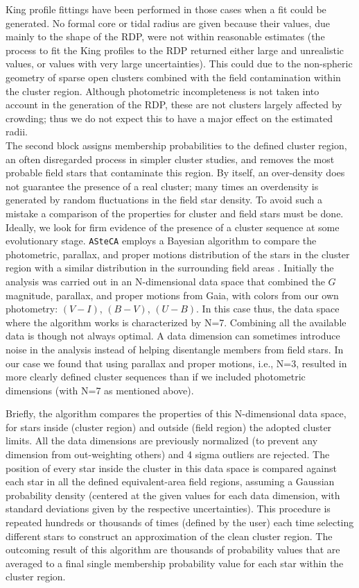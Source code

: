 \documentclass[draft]{aa}
\begin{document}
King profile \citep{King_1962} fittings have been performed in those cases when
a fit could be generated. No formal core or tidal radius are given because
their values, due mainly to the shape of the RDP, were not within reasonable
estimates (the process to fit the King profiles to the RDP returned either
large and unrealistic values, or values with very large uncertainties).
This could due to the non-spheric geometry of sparse open clusters
combined with the field contamination within the cluster region. Although
photometric incompleteness is not taken into account in the generation of the
RDP, these are not clusters largely affected by crowding; thus we do not
expect this to have a major effect on the estimated radii.\\

The second block assigns membership probabilities to the defined
cluster region, an often disregarded process in simpler cluster studies, 
and removes the most probable field stars that contaminate this region.
By itself, an over-density does not guarantee the presence of a real cluster;
many times an overdensity is generated by random fluctuations in the field star
density. To avoid such a mistake a comparison of the properties for cluster and
field stars must be done. Ideally, we look for firm evidence of the presence of
a cluster sequence at some evolutionary stage. \texttt{ASteCA} employs a
Bayesian algorithm to compare the photometric, parallax, and proper motions
distribution of the stars in the cluster region with a similar distribution in
the surrounding field areas \citep{Perren_2015}. Initially the analysis
was carried out in an N-dimensional data space that combined the
$G$ magnitude, parallax, and proper motions from Gaia, with colors from our own
photometry: $(V-I)$, $(B-V)$, $(U-B)$. In this case thus, the data space where
the algorithm works is characterized by N=7.
Combining all the available data is though not always optimal. A
data dimension can sometimes introduce noise in the analysis instead of helping
disentangle members from field stars. In our case we found that using
parallax and proper motions, i.e., N=3, resulted in more clearly defined
cluster sequences than if we included photometric dimensions (with N=7 as
mentioned above).

%
Briefly, the algorithm compares the properties of this N-dimensional data space,
for stars inside (cluster region) and outside (field region)
the adopted cluster limits. All the data dimensions are previously normalized 
(to prevent any dimension from out-weighting others) and 4 sigma outliers are
rejected.
The position of every star inside the cluster in this data space is compared
against each star in all the defined equivalent-area field regions,
assuming a Gaussian probability density (centered at the given values for each
data dimension, with standard deviations given by the respective
uncertainties). This procedure is repeated hundreds or thousands of times 
(defined by the user) each time selecting different stars to construct an
approximation of the clean cluster region. The outcoming result of this
algorithm are thousands of probability values that are averaged to a final
single membership probability value for each star within the cluster region.
\end{document}
